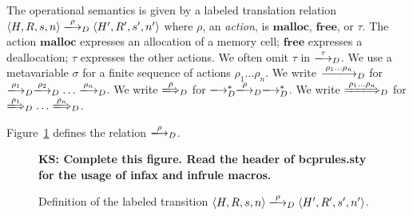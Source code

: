 \documentclass[english]{jssst_ppl} %
\newcommand\SKIP{\mathbf{skip}}
\newcommand\coma{,\;}
\newcommand\Malloc{\mathbf{malloc}}
\newcommand\Free{\mathbf{free}}
\theoremstyle{definition}
\newcommand\todo[1]{{\bf KS: {#1}}}
\begin{document}
The operational semantics is given by a labeled translation relation
\(\langle H, R, s, n \rangle \xlongrightarrow{\rho}_D \langle H', R',
s', n' \rangle\) where \(\rho\), an \emph{action}, is \(\Malloc\),
\(\Free\), or \(\tau\).  The action \(\Malloc\) expresses an
allocation of a memory cell; \(\Free\) expresses a deallocation;
\(\tau\) expresses the other actions.  We often omit \(\tau\) in
\(\xlongrightarrow{\tau}_D\).  We use a metavariable \(\sigma\) for a
finite sequence of actions \(\rho_1\dots\rho_n\).  We write
\(\xlongrightarrow{\rho_1\dots\rho_n}_D\) for
\(\xlongrightarrow{\rho_1}_D\xlongrightarrow{\rho_2}_D\dots\xlongrightarrow{\rho_n}_D\).
We write \(\xLongrightarrow{\rho}_D\) for
\(\xlongrightarrow{}_D^*\xlongrightarrow{\rho}_D\xlongrightarrow{}_D^*\).
We write \(\xLongrightarrow{\rho_1\dots\rho_n}_D\) for
\(\xLongrightarrow{\rho_1}_D\dots\xLongrightarrow{\rho_n}_D\).


Figure~\ref{fig:transitionRules} defines the relation
\(\xlongrightarrow{\rho}_D\).

\begin{figure}
\begin{minipage}{\textwidth}

\infax[Tr-Skip]
{\langle H, R, \SKIP;s, n \rangle
\longrightarrow_{D}
\langle H, R, s, n \rangle}

\todo{Complete this figure.  Read the header of bcprules.sty for the
  usage of infax and infrule macros.}

\end{minipage}
\label{fig:transitionRules}
\caption{Definition of the labeled transition \(\langle H, R, s, n
  \rangle \xlongrightarrow{\rho}_D \langle H', R', s', n' \rangle\).}
\end{figure}
\end{document}
